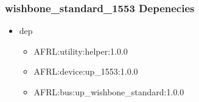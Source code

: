 \subsubsection{wishbone\_standard\_1553 Depenecies}
\begin{itemize}
\item dep
	\begin{itemize}
	\item AFRL:utility:helper:1.0.0
	\item AFRL:device:up\_1553:1.0.0
	\item AFRL:bus:up\_wishbone\_standard:1.0.0
	\end{itemize}
\end{itemize}
